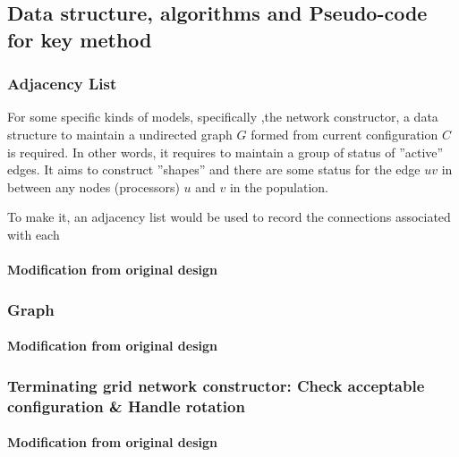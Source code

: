 \subsection{Data structure, algorithms and Pseudo-code for key method}
\subsubsection{Adjacency List}
\par\noindent
For some specific kinds of models, specifically ,the network constructor, a data
structure to maintain a undirected graph $G$ formed from current configuration $C$ is required. In other words, it requires to maintain
a group of status of ”active” edges. It aims to construct ”shapes”
and there are some status for the edge $uv$ in between any nodes (processors) $u$
and $v$ in the population.

\par\noindent
To make it, an adjacency list would be used to record the connections associated
with each



\paragraph{Modification from original design}
\subsubsection{Graph}
\paragraph{Modification from original design}
\subsubsection{Terminating grid network constructor: Check acceptable configuration \& Handle rotation}  %
\paragraph{Modification from original design}
